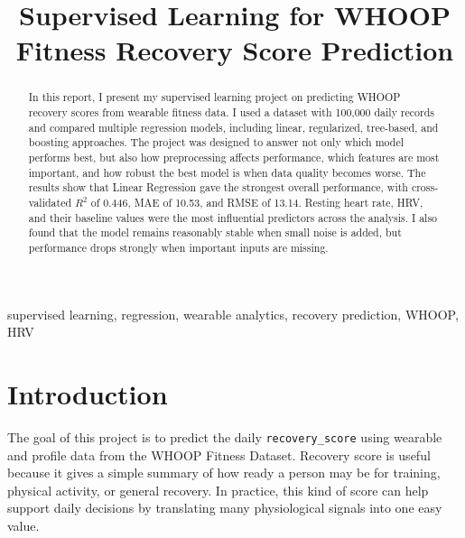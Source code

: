 \documentclass[conference]{IEEEtran}
\newcommand{\Rsq}{$R^{2}$}
\begin{document}
\title{Supervised Learning for WHOOP Fitness Recovery Score Prediction}

\author{
\and
{}
}

\maketitle

\begin{abstract}
In this report, I present my supervised learning project on predicting WHOOP recovery scores from wearable fitness data. I used a dataset with 100{,}000 daily records and compared multiple regression models, including linear, regularized, tree-based, and boosting approaches. The project was designed to answer not only which model performs best, but also how preprocessing affects performance, which features are most important, and how robust the best model is when data quality becomes worse. The results show that Linear Regression gave the strongest overall performance, with cross-validated \Rsq{} of 0.446, MAE of 10.53, and RMSE of 13.14. Resting heart rate, HRV, and their baseline values were the most influential predictors across the analysis. I also found that the model remains reasonably stable when small noise is added, but performance drops strongly when important inputs are missing.
\end{abstract}

\begin{IEEEkeywords}
supervised learning, regression, wearable analytics, recovery prediction, WHOOP, HRV
\end{IEEEkeywords}

\section{Introduction}
The goal of this project is to predict the daily \texttt{recovery\_score} using wearable and profile data from the WHOOP Fitness Dataset. Recovery score is useful because it gives a simple summary of how ready a person may be for training, physical activity, or general recovery. In practice, this kind of score can help support daily decisions by translating many physiological signals into one easy value.
\end{document}
